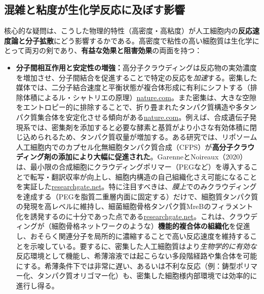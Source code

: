 \subsection{混雑と粘度が生化学反応に及ぼす影響}

核心的な疑問は、こうした物理的特性（高密度・高粘度）が人工細胞内の\textbf{反応速度論と分子拡散}にどう影響するかである。高密度で粘性の高い細胞質は生化学にとって両刃の剣であり、\textbf{有益な効果と阻害効果}の両面を持つ：

\begin{itemize}
    \item \textbf{分子間相互作用と安定性の増強：}高分子クラウディングは反応物の実効濃度を増加させ、分子間結合を促進することで特定の反応を\textit{加速}する。密集した媒体では、二分子結合速度と平衡状態が複合体形成に有利にシフトする（排除体積によるル・シャトリエの原理）\href{https://www.nature.com/articles/nrmicro.2017.17?error=cookies_not_supported&code=87b4b2eb-5370-49be-862f-ed6bad1e1b44\#:~:text=Macromolecular\%20crowding\%20affects\%20the\%20mobility,we\%20propose\%20that\%20the\%20term}{nature.com}。また密集は、大きな空隙をエントロピー的に排除することで、折り畳まれたタンパク質構造や多タンパク質集合体を安定化させる傾向がある\href{https://www.nature.com/articles/nrmicro.2017.17?error=cookies_not_supported&code=87b4b2eb-5370-49be-862f-ed6bad1e1b44\#:~:text=Macromolecular\%20crowding\%20affects\%20the\%20mobility,we\%20propose\%20that\%20the\%20term}{nature.com}。例えば、合成遺伝子発現系では、密集剤を添加すると必要な酵素と基質がより小さな有効体積に閉じ込められるため、タンパク質収量が増加する。ある研究では、リポソーム人工細胞内でのカプセル化無細胞タンパク質合成（CFPS）が\textbf{高分子クラウディング剤の添加により大幅に促進された}。GarenneとNoireaux（2020）は、最小限の合成細胞にクラウディングポリマー（PEGなど）を導入することで転写・翻訳収率が向上し、細胞内構造の自己組織化さえ可能になることを実証した\href{https://www.researchgate.net/publication/341582539_Analysis_of_Cytoplasmic_and_Membrane_Molecular_Crowding_in_Genetically_Programmed_Synthetic_Cells\#:~:text=,}{researchgate.net}。特に注目すべきは、\textit{膜上}でのみクラウディングを達成する（PEGを脂質二重層内面に固定する）だけで、細胞質タンパク質の発現を高レベルに維持し、細菌細胞骨格タンパク質MreBのフィラメント化を誘発するのに十分であった点である\href{https://www.researchgate.net/publication/341582539_Analysis_of_Cytoplasmic_and_Membrane_Molecular_Crowding_in_Genetically_Programmed_Synthetic_Cells\#:~:text=,}{researchgate.net}。これは、クラウディングが（細胞骨格ネットワークのような）\textbf{機能的複合体の組織化}を促進し、おそらく関連分子を局所的に濃縮することで高い反応速度を維持することを示唆している。要するに、密集した人工細胞質はより\textit{生物学的に有効な}反応環境として機能し、希薄溶液では起こらない多段階経路や集合体を可能にする。希薄条件下では非常に遅い、あるいは不利な反応（例：鋳型ポリマー化、タンパク質オリゴマー化）も、密集した細胞様内部環境では効率的に進行し得る。

\end{itemize}
